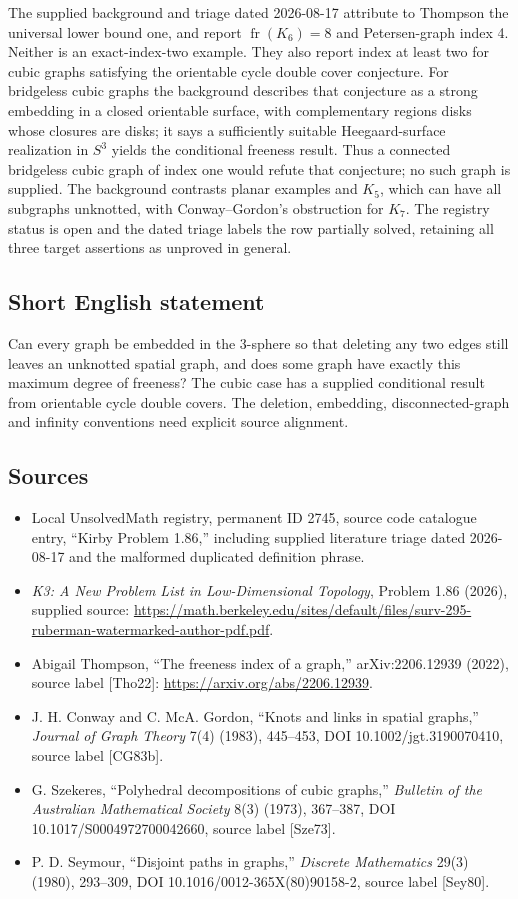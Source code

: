 \documentclass[11pt]{article}
\begin{document}
The supplied background and triage dated 2026-08-17 attribute to Thompson the universal lower bound one, and report \(\operatorname{fr}(K_6)=8\) and Petersen-graph index 4. Neither is an exact-index-two example. They also report index at least two for cubic graphs satisfying the orientable cycle double cover conjecture. For bridgeless cubic graphs the background describes that conjecture as a strong embedding in a closed orientable surface, with complementary regions disks whose closures are disks; it says a sufficiently suitable Heegaard-surface realization in \(S^3\) yields the conditional freeness result. Thus a connected bridgeless cubic graph of index one would refute that conjecture; no such graph is supplied. The background contrasts planar examples and \(K_5\), which can have all subgraphs unknotted, with Conway--Gordon's obstruction for \(K_7\). The registry status is open and the dated triage labels the row partially solved, retaining all three target assertions as unproved in general.
\subsection{Short English statement}
Can every graph be embedded in the 3-sphere so that deleting any two edges still leaves an unknotted spatial graph, and does some graph have exactly this maximum degree of freeness? The cubic case has a supplied conditional result from orientable cycle double covers. The deletion, embedding, disconnected-graph and infinity conventions need explicit source alignment.
\subsection{Sources}
\begin{itemize}
\item Local UnsolvedMath registry, permanent ID 2745, source code catalogue entry, ``Kirby Problem 1.86,'' including supplied literature triage dated 2026-08-17 and the malformed duplicated definition phrase.
\item \emph{K3: A New Problem List in Low-Dimensional Topology}, Problem 1.86 (2026), supplied source: \url{https://math.berkeley.edu/sites/default/files/surv-295-ruberman-watermarked-author-pdf.pdf}.
\item Abigail Thompson, ``The freeness index of a graph,'' arXiv:2206.12939 (2022), source label [Tho22]: \url{https://arxiv.org/abs/2206.12939}.
\item J. H. Conway and C. McA. Gordon, ``Knots and links in spatial graphs,'' \emph{Journal of Graph Theory} 7(4) (1983), 445--453, DOI 10.1002/jgt.3190070410, source label [CG83b].
\item G. Szekeres, ``Polyhedral decompositions of cubic graphs,'' \emph{Bulletin of the Australian Mathematical Society} 8(3) (1973), 367--387, DOI 10.1017/S0004972700042660, source label [Sze73].
\item P. D. Seymour, ``Disjoint paths in graphs,'' \emph{Discrete Mathematics} 29(3) (1980), 293--309, DOI 10.1016/0012-365X(80)90158-2, source label [Sey80].
\end{itemize}
\end{document}
